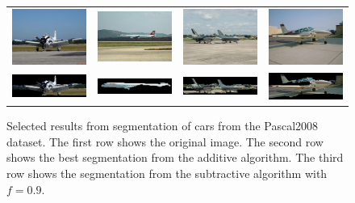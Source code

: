 \documentclass[10pt,twocolumn,letterpaper]{article}
\begin{document}
\begin{figure}[p]
\centering
\begin{tabular}{ p{4cm} p{4cm} p{4cm} p{4cm} }
\includegraphics[width=3.95cm]{figures/add_res/plane/2008_000021.jpg.eps} &
\includegraphics[width=3.95cm]{figures/add_res/plane/2008_001971.jpg.eps} &
\includegraphics[width=3.95cm]{figures/add_res/plane/2008_002673.jpg.eps} &
\includegraphics[width=3.95cm]{figures/add_res/plane/2008_002138.jpg.eps} \\
\includegraphics[width=3.95cm]{figures/add_res/plane/2008_000021.jpg_2_good.jpg.eps} &
\includegraphics[width=3.95cm]{figures/add_res/plane/2008_001971.jpg_2_good.jpg.eps} &
\includegraphics[width=3.95cm]{figures/add_res/plane/2008_002673.jpg_2_good.jpg.eps} &
\includegraphics[width=3.95cm]{figures/add_res/plane/2008_002138.jpg_2_good.jpg.eps} \\
\end{tabular}
\caption{Selected results from segmentation of cars from the Pascal2008
dataset.  The first row shows the original image.  The second row shows
the best segmentation from the additive algorithm.  The third row shows
the segmentation from the subtractive algorithm with $f=0.9$.}
\label{fig:good_results_car}
\end{figure}
\end{document}
